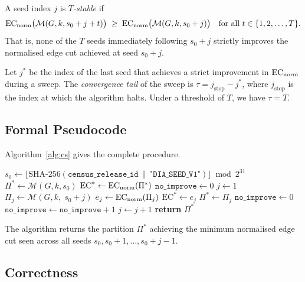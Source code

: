 \begin{definition}[$T$-Stability]
\label{def:tstable}
A seed index $j$ is \emph{$T$-stable} if
\[
  \mathrm{EC}_{\mathrm{norm}}\bigl(\mathcal{M}(G, k, s_0 + j + t)\bigr)
  \;\ge\;
  \mathrm{EC}_{\mathrm{norm}}\bigl(\mathcal{M}(G, k, s_0 + j)\bigr)
  \quad
  \text{for all } t \in \{1, 2, \ldots, T\}.
\]
That is, none of the $T$ seeds immediately following $s_0 + j$ strictly
improves the normalised edge cut achieved at seed $s_0 + j$.
\end{definition}

\begin{definition}
\label{def:tail}
Let $j^*$ be the index of the last seed that achieves a strict improvement
in $\mathrm{EC}_{\mathrm{norm}}$ during a sweep.
The \emph{convergence tail} of the sweep is $\tau = j_{\mathrm{stop}} - j^*$,
where $j_{\mathrm{stop}}$ is the index at which the algorithm halts.
Under a threshold of $T$, we have $\tau = T$.
\end{definition}

\subsection{Formal Pseudocode}

Algorithm~\ref{alg:cs} gives the complete \cs{} procedure.

\begin{algorithm}[t]
\caption{}
\label{alg:cs}
\begin{algorithmic}[1]
\State $s_0 \gets \lfloor \mathrm{SHA\text{-}256}(\mathtt{census\_release\_id}
       \,\|\, \texttt{"DIA\_SEED\_V1"}) \rfloor \bmod 2^{31}$
\State $\Pi^* \gets \mathcal{M}(G, k, s_0)$
\State $\mathrm{EC}^* \gets \mathrm{EC}_{\mathrm{norm}}(\Pi^*)$
\State $\mathtt{no\_improve} \gets 0$
\State $j \gets 1$
  \State $\Pi_j \gets \mathcal{M}(G, k,\; s_0 + j)$
  \State $e_j \gets \mathrm{EC}_{\mathrm{norm}}(\Pi_j)$
    \State $\mathrm{EC}^* \gets e_j$
    \State $\Pi^* \gets \Pi_j$
    \State $\mathtt{no\_improve} \gets 0$
  \Else
    \State $\mathtt{no\_improve} \gets \mathtt{no\_improve} + 1$
  \EndIf
  \State $j \gets j + 1$
\EndWhile
\State \textbf{return} $\Pi^*$
\end{algorithmic}
\end{algorithm}

The algorithm returns the partition $\Pi^*$ achieving the minimum normalised
edge cut seen across all seeds $s_0, s_0+1, \ldots, s_0 + j - 1$.

\subsection{Correctness}

